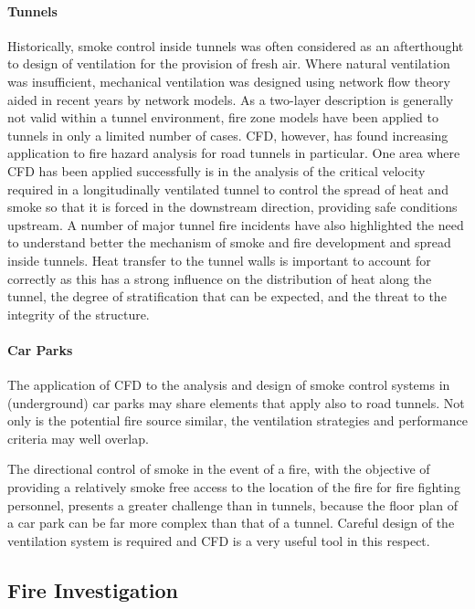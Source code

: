 \documentclass[graybox]{svmult}
\begin{document}
\paragraph{Tunnels}

Historically, smoke control inside tunnels was often considered as an afterthought to design of ventilation for the provision of fresh air. Where natural ventilation was insufficient, mechanical ventilation was designed using network flow theory aided in recent years by network models. As a two-layer description is generally not valid within a tunnel environment, fire zone models have been applied to tunnels in only a limited number of cases. CFD, however, has found increasing application to fire hazard analysis for road tunnels in particular. One area where CFD has been applied successfully is in the analysis of the critical velocity required in a longitudinally ventilated tunnel to control the spread of heat and smoke so that it is forced in the downstream direction, providing safe conditions upstream. A number of major tunnel fire incidents have also highlighted the need to understand better the mechanism of smoke and fire development and spread inside tunnels. Heat transfer to the tunnel walls is important to account for correctly as this has a strong influence on the distribution of heat along the tunnel, the degree of stratification that can be expected, and the threat to the integrity of the structure.


\paragraph{Car Parks}

The application of CFD to the analysis and design of smoke control systems in (underground) car parks may share elements that apply also to road tunnels. Not only is the potential fire source similar, the ventilation strategies and performance criteria may well overlap.

The directional control of smoke in the event of a fire, with the objective of providing a relatively smoke free access to the location of the fire for fire fighting personnel, presents a greater challenge than in tunnels, because the floor plan of a car park can be far more complex than that of a tunnel. Careful design of the ventilation system is required and CFD is a very useful tool in this respect.



\subsection{Fire Investigation}
\end{document}
